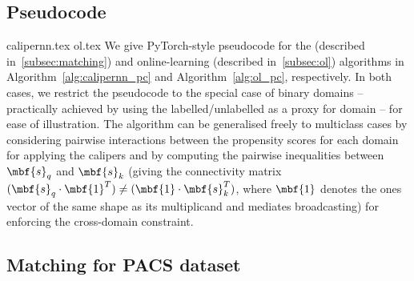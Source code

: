 \subsection{Pseudocode}\label{appx:pseudocode}
%
{calipernn.tex}
{ol.tex}
%
\noindent We give PyTorch-style \citep{paszke2019pytorch} pseudocode for the \CNN{}
(described in~\ref{subsec:matching}) and online-learning (described in~\ref{subsec:ol}) algorithms
in Algorithm~\ref{alg:calipernn_pc} and Algorithm~\ref{alg:ol_pc}, respectively.
In both cases, we restrict the pseudocode to the special case of binary domains --
 practically achieved by using the labelled/unlabelled as a proxy for domain -- 
for ease of illustration.
The \CNN{} algorithm can be generalised freely to multiclass cases by considering pairwise
interactions between the propensity scores for each domain for applying the calipers and by
computing the pairwise inequalities between $\mbf{s}_q$ and $\mbf{s}_k$ (giving the connectivity
matrix \( (\mbf{s}_q \cdot \mbf{1}^T) \neq (\mbf{1} \cdot \mbf{s}_k^T) \), where $\mbf{1}$ denotes the
ones vector of the same shape as its multiplicand and mediates broadcasting) for enforcing the
cross-domain constraint.
 
\subsection{Matching for PACS dataset}\label{appx:pacs_matching}

